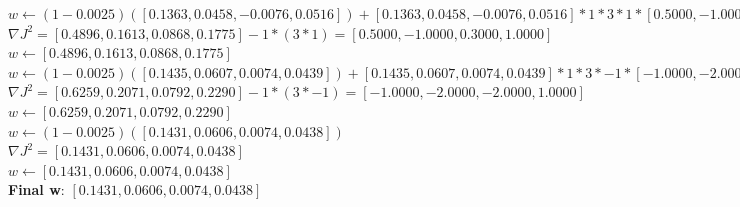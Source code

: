 \documentclass[12pt, fullpage,letterpaper]{article}
\begin{document}
\begin{enumerate}
$w \leftarrow (1 - 0.0025)([0.1363,0.0458,-0.0076,0.0516]) + [0.1363,0.0458,-0.0076,0.0516]*1*3*1*[0.5000,-1.0000,0.3000,1.0000]$\\
$\nabla J^2 = [0.4896,0.1613,0.0868,0.1775] - 1*(3*1) = [0.5000,-1.0000,0.3000,1.0000]$\\
$w \leftarrow [0.4896,0.1613,0.0868,0.1775]$\\

$w \leftarrow (1 - 0.0025)([0.1435,0.0607,0.0074,0.0439]) + [0.1435,0.0607,0.0074,0.0439]*1*3*-1*[-1.0000,-2.0000,-2.0000,1.0000]$\\
$\nabla J^2 = [0.6259,0.2071,0.0792,0.2290] - 1*(3*-1) = [-1.0000,-2.0000,-2.0000,1.0000]$\\
$w \leftarrow [0.6259,0.2071,0.0792,0.2290]$\\

$w \leftarrow (1 - 0.0025)([0.1431,0.0606,0.0074,0.0438])$\\
$\nabla J^2 = [0.1431,0.0606,0.0074,0.0438]$\\
$w \leftarrow [0.1431,0.0606,0.0074,0.0438]$\\


\textbf{Final w}: $[0.1431,0.0606,0.0074,0.0438]$\\

\end{enumerate}
\end{document}
